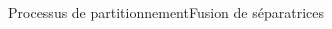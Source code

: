 \documentclass[compress,10pt,aspectratio=169]{beamer}
\begin{document}
\begin{frame}{Processus de partitionnement}{Fusion de séparatrices}
\begin{columns}
\begin{column}{0.4\textwidth}
\vspace{0.5cm}
\end{column}
\end{columns}
\end{frame}
\end{document}
